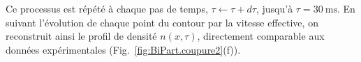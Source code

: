 \medskip

Ce processus est répété à chaque pas de temps, \(\tau \leftarrow \tau + d\tau\), jusqu’à \(\tau = 30~\mathrm{ms}\).  
En suivant l’évolution de chaque point du contour par la vitesse effective, on reconstruit ainsi le profil de densité \(n(x,\tau)\), directement comparable aux données expérimentales (Fig.~\ref{fig:BiPart.coupure2}(f)).



%	
%	
